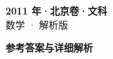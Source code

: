 \documentclass[zihao=-4, a4paper]{ctexart}
\begin{document}
\begin{center}
  {\Large\bfseries 2011 年·北京卷·文科}\\[4pt]
  {\large 数学 · 解析版}
\end{center}
\medskip
{}

\clearpage
{}
\begin{center}{\Large\bfseries 参考答案与详细解析}\end{center}
\medskip

\end{document}
